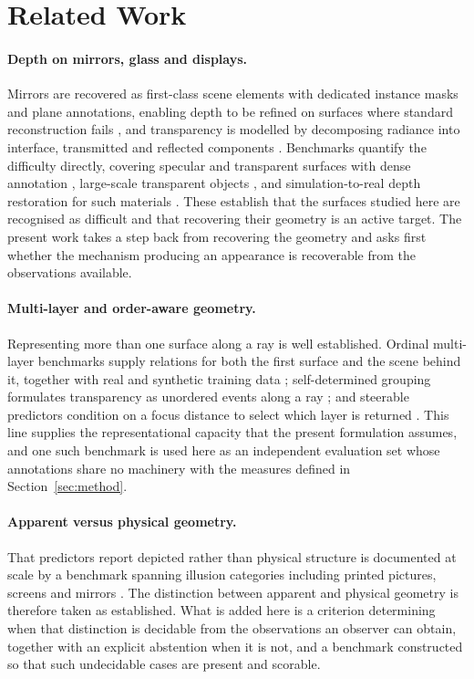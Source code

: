 \section{Related Work}
\label{sec:related}

\paragraph{Depth on mirrors, glass and displays.}
Mirrors are recovered as first-class scene elements with dedicated instance masks
and plane annotations, enabling depth to be refined on surfaces where standard
reconstruction fails \citep{mirror3d2021}, and transparency is modelled by
decomposing radiance into interface, transmitted and reflected components
\citep{glint2026}. Benchmarks quantify the difficulty directly, covering specular
and transparent surfaces with dense annotation \citep{booster2023}, large-scale
transparent objects \citep{clearpose2022}, and simulation-to-real depth
restoration for such materials \citep{dreds2022}. These establish that the
surfaces studied here are recognised as difficult and that recovering their
geometry is an active target. The present work takes a step back from recovering
the geometry and asks first whether the mechanism producing an appearance is
recoverable from the observations available.

\paragraph{Multi-layer and order-aware geometry.}
Representing more than one surface along a ray is well established. Ordinal
multi-layer benchmarks supply relations for both the first surface and the scene
behind it, together with real and synthetic training data
\citep{layereddepth2025}; self-determined grouping formulates transparency as
unordered events along a ray \citep{seegroup2026}; and steerable predictors
condition on a focus distance to select which layer is returned
\citep{depthfocus2026}. This line supplies the representational capacity that the
present formulation assumes, and one such benchmark is used here as an independent
evaluation set whose annotations share no machinery with the measures defined in
Section~\ref{sec:method}.

\paragraph{Apparent versus physical geometry.}
That predictors report depicted rather than physical structure is documented at
scale by a benchmark spanning illusion categories including printed pictures,
screens and mirrors \citep{illusion2025}. The distinction between apparent and
physical geometry is therefore taken as established. What is added here is a
criterion determining when that distinction is decidable from the observations an
observer can obtain, together with an explicit abstention when it is not, and a
benchmark constructed so that such undecidable cases are present and scorable.

